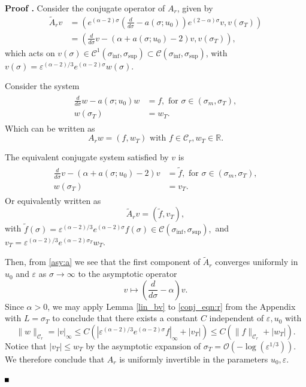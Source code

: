 \documentclass[letterpaper,11pt]{article}
\newcommand{\rmO}{\mathcal{O}}
\newcommand{\eps}{\varepsilon}
\numberwithin{equation}{section}
\theoremstyle{plain}
\newenvironment{Proof}[1][\unskip]%
 {\begin{trivlist} \item[]{\bf Proof #1. }}%
 {\hspace*{\fill}$\rule{.4\baselineskip}{.4\baselineskip}$\end{trivlist}}
\begin{document}
\begin{Proof}
Consider the conjugate operator of $A_r$, given by
\begin{align*}
\tilde{A}_r v &= \left( e^{(\alpha-2)\sigma}\left(\frac{d}{d\sigma}-a(\sigma;u_0)\right)e^{(2-\alpha)\sigma} v, v(\sigma_T) \right) \\
&= \left( \frac{d}{d\sigma}v -(\alpha+a(\sigma;u_0)-2)v, v(\sigma_T) \right),
\end{align*}
which acts on $v(\sigma) \in \mathcal{C}^1(\sigma_{\inf}, \sigma_{\sup}) \subset \mathcal{C}(\sigma_{\inf}, \sigma_{\sup})$, with $v(\sigma) = \eps^{(\alpha-2)/3}e^{(\alpha-2)\sigma}w(\sigma)$. 

Consider the system 
\begin{align*}
\begin{split}
\frac{d}{d\sigma} w - a(\sigma;u_0)w &= f, \text{ for } \sigma \in (\sigma_m, \sigma_T),\\
w(\sigma_T) &= w_T.
\end{split}
\end{align*}
Which can be written as 
\[
A_r w = (f,w_T) \text{ with } f \in \mathcal{C}_r, w_T \in \mathbb{R}.
\] 

The equivalent conjugate system satisfied by $v$ is 
\begin{align*}
\begin{split}
\frac{d}{d\sigma}v -(\alpha+a(\sigma;u_0)-2)v &= \tilde{f}, \text{ for } \sigma \in (\sigma_m, \sigma_T),\\
w(\sigma_T) &= v_T.
\end{split}
\end{align*}
Or equivalently written as
\begin{equation}\label{conj_eqn:r}
\tilde{A}_r v = (\tilde{f},v_T),
\end{equation}
with $\tilde{f}(\sigma) = \eps^{(\alpha-2)/3}e^{(\alpha-2)\sigma} f(\sigma) \in \mathcal{C}(\sigma_{\inf}, \sigma_{\sup}),$ and $v_T = \eps^{(\alpha-2)/3} e^{(\alpha-2)\sigma_T}w_T$.
 
Then, from \eqref{asy:a} we see that the first component of $\tilde{A}_r$ converges uniformly in $u_0$ and $\eps$ as $\sigma \to \infty$ to the asymptotic operator 
\[
v\mapsto \left(\frac{d}{d\sigma} -\alpha \right) v.
\] 
Since $\alpha>0$, we may apply Lemma \ref{lin_bv} to \eqref{conj_eqn:r} from the Appendix with $L= \sigma_T$ to conclude that there exists a constant $C$ independent of $\eps, u_0$ with 
\begin{equation}\label{linear_est:r}
\|w\|_{\mathcal{C}_r} = |v|_\infty \le C(|\eps^{(\alpha-2)/3}e^{(\alpha-2)\sigma} f |_{\infty}+|v_T|) \le C(\|f\|_{\mathcal{C}_r}+|w_T|).
\end{equation}
Notice that $|v_T| \le w_T$ by the asymptotic expansion of $\sigma_T  = \rmO(-\log(\eps^{1/3}))$. We therefore conclude that $A_r$ is uniformly invertible in the parameters $u_0,\eps$.


\end{Proof}
\end{document}
